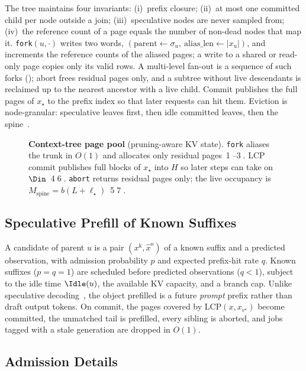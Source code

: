 The tree maintains four invariants: (i)~prefix closure; (ii)~at most one committed child per node outside a join; (iii)~speculative nodes are never sampled from; (iv)~the reference count of a page equals the number of non-dead nodes that map it.
\texttt{fork}$(u,\cdot)$ writes two words, $(\mathrm{parent}\leftarrow\sigma_u,\ \mathrm{alias\_len}\leftarrow|x_u|)$, and increments the reference counts of the aliased pages; a write to a shared or read-only page copies only its valid rows.
A multi-level fan-out is a sequence of such forks (); abort frees residual pages only, and a subtree without live descendants is reclaimed up to the nearest ancestor with a live child.
Commit publishes the full pages of $x_\star$ to the prefix index so that later requests can hit them.
Eviction is node-granular: speculative leaves first, then idle committed leaves, then the spine~\cite{continuum,mori}.

\begin{figure}[t]
\centering
\resizebox{\textwidth}{!}{}
\caption{\textbf{Context-tree page pool} (pruning-aware KV state).
\texttt{fork} aliases the trunk in $O(1)$ and allocates only residual pages~\textcircled{1}--\textcircled{3}.
LCP commit publishes full blocks of $x_\star$ into $H$ so later steps can take \Hit on $\Din$~\textcircled{4}\textcircled{6}.
\texttt{abort} returns residual pages only; the live occupancy is $M_{\mathrm{spine}}{=}b(L{+}\ell_\star)$~\textcircled{5}\textcircled{7}.}
\label{fig:pool}
\end{figure}

\subsection{Speculative Prefill of Known Suffixes}
\label{sec:speculate}
A candidate of parent $u$ is a pair $(x^{\mathrm{k}},\hat{x}^{\mathrm{o}})$ of a known suffix and a predicted observation, with admission probability $p$ and expected prefix-hit rate $q$.
Known suffixes ($p{=}q{=}1$) are scheduled before predicted observations ($q{<}1$), subject to the idle time $\Idle(u)$, the available KV capacity, and a branch cap.
Unlike speculative decoding~\cite{speculative,medusa}, the object prefilled is a future \emph{prompt} prefix rather than draft output tokens.
On commit, the pages covered by $\mathrm{LCP}(x,x_{v^\star})$ become committed, the unmatched tail is prefilled, every sibling is aborted, and jobs tagged with a stale generation are dropped in $O(1)$.

\subsection{Admission Details}
\label{sec:app-detail}


